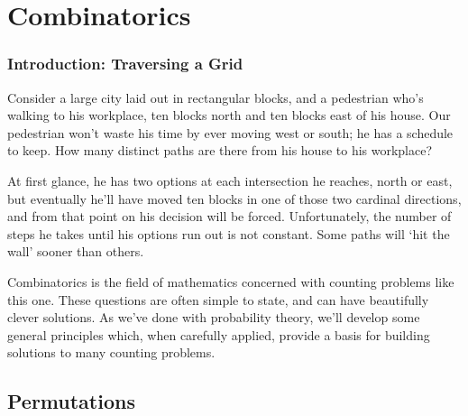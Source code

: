 \pagestyle{headings}
\chapter{Combinatorics} \label{chp 2}
\thispagestyle{fancy}

\subsection*{Introduction: Traversing a Grid}
Consider a large city laid out in rectangular blocks, and a pedestrian who's walking to his workplace, ten blocks north and ten blocks east of his house. Our pedestrian won't waste his time by ever moving west or south; he has a schedule to keep. How many distinct paths are there from his house to his workplace?

\begin{center}
\end{center}
\par
At first glance, he has two options at each intersection he reaches, north or east, but eventually he'll have moved ten blocks in one of those two cardinal directions, and from that point on his decision will be forced. Unfortunately, the number of steps he takes until his options run out is not constant. Some paths will `hit the wall' sooner than others.
\par
Combinatorics is the field of mathematics concerned with counting problems like this one. These questions are often simple to state, and can have beautifully clever solutions. As we've done with probability theory, we'll develop some general principles which, when carefully applied, provide a basis for building solutions to many counting problems.
\newpage

\section{Permutations} \label{sec 2.1}

